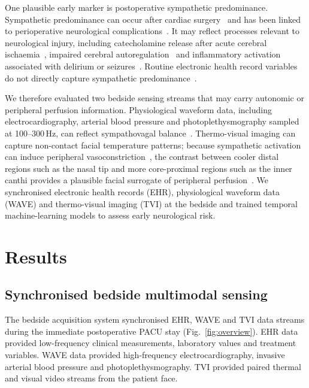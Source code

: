 \documentclass[pdflatex,sn-basic,Numbered]{sn-jnl}
\theoremstyle{thmstyleone}%
\theoremstyle{thmstyletwo}%
\theoremstyle{thmstylethree}%
\begin{document}
One plausible early marker is postoperative sympathetic predominance. Sympathetic predominance can occur after cardiac surgery~\citep{hogue1994alterations, bauernschmitt2004impairment} and has been linked to perioperative neurological complications~\citep{pan2025effect, patel2022potential}. It may reflect processes relevant to neurological injury, including catecholamine release after acute cerebral ischaemia~\citep{jimenez2021cardiovascular, sposato2020post}, impaired cerebral autoregulation~\citep{chen2021autonomic, mankoo2023role, aaslid1989cerebral, lee2019dysfunctional, schramm2012impaired, longhitano2021cerebral} and inflammatory activation associated with delirium or seizures~\citep{mattimore2023delirium, staicu2025postoperative, hansen2025prediction, pongratz2014sympathetic, poredos2025inflammation}. Routine electronic health record variables do not directly capture sympathetic predominance~\citep{seravalle2013assess}.

We therefore evaluated two bedside sensing streams that may carry autonomic or peripheral perfusion information. Physiological waveform data, including electrocardiography, arterial blood pressure and photoplethysmography sampled at 100--300\,Hz, can reflect sympathovagal balance~\citep{colombo2015pulse, valenza2018ecg, adam2023heart, olivieri2024heart}. Thermo-visual imaging can capture non-contact facial temperature patterns; because sympathetic activation can induce peripheral vasoconstriction~\citep{guyenet2006sympathetic, sheng2018crosstalk}, the contrast between cooler distal regions such as the nasal tip and more core-proximal regions such as the inner canthi provides a plausible facial surrogate of peripheral perfusion~\citep{predicting_shock_from_thermal_images, jorge_non-contact_2021, podlasek2025thermography}. We synchronised electronic health records (EHR), physiological waveform data (WAVE) and thermo-visual imaging (TVI) at the bedside and trained temporal machine-learning models to assess early neurological risk.

\section{Results}

\subsection{Synchronised bedside multimodal sensing}

The bedside acquisition system synchronised EHR, WAVE and TVI data streams during the immediate postoperative PACU stay (Fig.~\ref{fig:overview}). EHR data provided low-frequency clinical measurements, laboratory values and treatment variables. WAVE data provided high-frequency electrocardiography, invasive arterial blood pressure and photoplethysmography. TVI provided paired thermal and visual video streams from the patient face.
\end{document}
